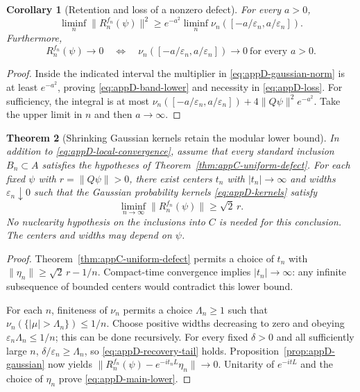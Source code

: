 \documentclass[a4paper,11pt]{article}
\newtheorem{theorem}{Theorem}
\newtheorem{corollary}[theorem]{Corollary}
\theoremstyle{definition}
\begin{document}
\begin{corollary}[Retention and loss of a nonzero defect]
\label{cor:appD-band-detection}
For every $a>0$,
\begin{equation}
 \liminf_n\|R_n^{f_n}(\psi)\|^2
 \ge e^{-a^2}\liminf_n
 \nu_n([-a/\varepsilon_n,a/\varepsilon_n]).
 \label{eq:appD-band-lower}
\end{equation}
Furthermore,
\begin{equation}
 R_n^{f_n}(\psi)\longrightarrow0
 \quad\Longleftrightarrow\quad
 \nu_n([-a/\varepsilon_n,a/\varepsilon_n])\longrightarrow0
 \ \text{for every }a>0.
 \label{eq:appD-loss}
\end{equation}
\end{corollary}
\begin{proof}
Inside the indicated interval the multiplier in \eqref{eq:appD-gaussian-norm} is at least $e^{-a^2}$, proving \eqref{eq:appD-band-lower} and necessity in \eqref{eq:appD-loss}. For sufficiency, the integral is at most
$\nu_n([-a/\varepsilon_n,a/\varepsilon_n])+4\|Q\psi\|^2e^{-a^2}$.
Take the upper limit in $n$ and then $a\to\infty$.
\end{proof}

\begin{theorem}[Shrinking Gaussian kernels retain the modular lower bound]
\label{thm:appD-detecting-kernels}
In addition to \eqref{eq:appD-local-convergence}, assume that every standard inclusion $B_n\subset A$ satisfies the hypotheses of Theorem~\ref{thm:appC-uniform-defect}. For each fixed $\psi$ with $r=\|Q\psi\|>0$, there exist centers $t_n$ with $|t_n|\to\infty$ and widths $\varepsilon_n\downarrow0$ such that the Gaussian probability kernels \eqref{eq:appD-kernels} satisfy
\begin{equation}
 \liminf_{n\to\infty}\|R_n^{f_n}(\psi)\|
 \ge\sqrt2\,r.
 \label{eq:appD-main-lower}
\end{equation}
No nuclearity hypothesis on the inclusions into $C$ is needed for this conclusion. The centers and widths may depend on $\psi$.
\end{theorem}
\begin{proof}
Theorem~\ref{thm:appC-uniform-defect} permits a choice of $t_n$ with
$\|\eta_n\|\ge\sqrt2\,r-1/n$. Compact-time convergence implies $|t_n|\to\infty$: any infinite subsequence of bounded centers would contradict this lower bound.

For each $n$, finiteness of $\nu_n$ permits a choice $\Lambda_n\ge1$ such that
$\nu_n(\{|\mu|>\Lambda_n\})\le1/n$.
Choose positive widths decreasing to zero and obeying
$\varepsilon_n\Lambda_n\le1/n$; this can be done recursively.
For every fixed $\delta>0$ and all sufficiently large $n$,
$\delta/\varepsilon_n\ge\Lambda_n$, so \eqref{eq:appD-recovery-tail} holds.
Proposition~\ref{prop:appD-gaussian} now yields
$\|R_n^{f_n}(\psi)-e^{-it_nL}\eta_n\|\to0$.
Unitarity of $e^{-itL}$ and the choice of $\eta_n$ prove \eqref{eq:appD-main-lower}.
\end{proof}
\end{document}
